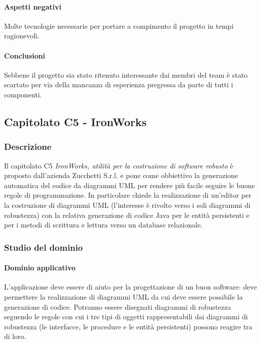 	\paragraph{Aspetti negativi} \Spazio
     Molte tecnologie necessarie per portare a compimento il progetto in tempi ragionevoli.

	\paragraph{Conclusioni} \Spazio
	Sebbene il progetto sia stato ritenuto interessante dai membri del team è stato scartato per via della mancanza di esperienza pregressa da parte di tutti i componenti.
	
	\subsection{Capitolato C5 - IronWorks}
		\subsubsection{Descrizione}
		Il capitolato C5 \emph{IronWorks, utilità per la costruzione di software robusto} è proposto dall'azienda Zucchetti S.r.l. e pone come obbiettivo la generazione automatica del codice da diagrammi UML per rendere più facile seguire le buone regole di programmazione. In particolare chiede la realizzazione di un'editor per la costruzione di diagrammi UML (l'interesse è rivolto verso i soli diagrammi di robustezza) con la relativa generazione di codice Java per le entità persistenti e per i metodi di scrittura e lettura verso un database relazionale. 
		\subsubsection{Studio del dominio}
			\paragraph{Dominio applicativo} \Spazio
			L'applicazione deve essere di aiuto per la progettazione di un buon software: deve permettere la realizzazione di diagrammi UML da cui deve essere possibile la generazione di codice. Potranno essere disegnati diagrammi di robustezza seguendo le regole con cui i tre tipi di oggetti rappresentabili dai diagrammi di robustezza (le interfacce, le procedure e le entità persistenti) possono reagire tra di loro.
